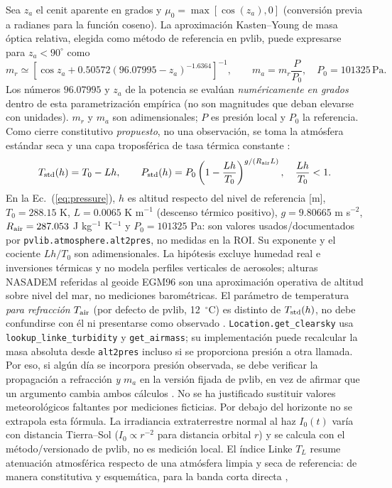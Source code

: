 \documentclass[11pt,a4paper]{article}
\begin{document}
Sea $z_a$ el cenit aparente en grados y $\mu_0=\max[\cos(z_a),0]$ (conversión previa a radianes para la función coseno). La aproximación Kasten--Young de masa óptica relativa, elegida como método de referencia en pvlib, puede expresarse para $z_a<90^\circ$ como \cite{kastenyoung1989,pvlibairmass}
\begin{equation}
 m_r\simeq\left[\cos z_a+0.50572(96.07995-z_a)^{-1.6364}\right]^{-1},\qquad
 m_a=m_r\frac{P}{P_0},\quad P_0=101325\,\mathrm{Pa}.\label{eq:airmass}
\end{equation}
Los números $96.07995$ y $z_a$ de la potencia se evalúan \emph{numéricamente en grados} dentro de esta parametrización empírica (no son magnitudes que deban elevarse con unidades). $m_r$ y $m_a$ son adimensionales; $P$ es presión local y $P_0$ la referencia. Como cierre constitutivo \emph{propuesto}, no una observación, se toma la atmósfera estándar seca y una capa troposférica de tasa térmica constante \cite{pvlibalt2pres}:
\begin{equation}
 T_{\rm std}(h)=T_0-Lh,\qquad
 P_{\rm std}(h)=P_0\left(1-\frac{Lh}{T_0}\right)^{g/(R_{\rm air}L)},\quad
 \frac{Lh}{T_0}<1.\label{eq:pressure}
\end{equation}
En la Ec.~(\ref{eq:pressure}), $h$ es altitud respecto del nivel de referencia [m], $T_0=288.15$ K, $L=0.0065$ K m$^{-1}$ (descenso térmico positivo), $g=9.80665$ m s$^{-2}$, $R_{\rm air}=287.053$ J kg$^{-1}$ K$^{-1}$ y $P_0=101325$ Pa: son valores usados/documentados por \texttt{pvlib.atmosphere.alt2pres}, no medidas en la ROI. Su exponente y el cociente $Lh/T_0$ son adimensionales. La hipótesis excluye humedad real e inversiones térmicas y no modela perfiles verticales de aerosoles; alturas NASADEM referidas al geoide EGM96 son una aproximación operativa de altitud sobre nivel del mar, no mediciones barométricas. El parámetro de temperatura \emph{para refracción} $T_{\rm air}$ (por defecto de pvlib, 12~$^\circ$C) es distinto de $T_{\rm std}(h)$, no debe confundirse con él ni presentarse como observado \cite{pvlibspa}. \texttt{Location.get\_clearsky} usa \texttt{lookup\_linke\_turbidity} y \texttt{get\_airmass}; su implementación puede recalcular la masa absoluta desde \texttt{alt2pres} incluso si se proporciona presión a otra llamada. Por eso, si algún día se incorpora presión observada, se debe verificar la propagación a refracción \emph{y} $m_a$ en la versión fijada de pvlib, en vez de afirmar que un argumento cambia ambos cálculos \cite{pvliblocationsource}. No se ha justificado sustituir valores meteorológicos faltantes por mediciones ficticias. Por debajo del horizonte no se extrapola esta fórmula. La irradiancia extraterrestre normal al haz $I_0(t)$ varía con distancia Tierra--Sol ($I_0\propto r^{-2}$ para distancia orbital $r$) y se calcula con el método/versionado de pvlib, no es medición local. El índice Linke $T_L$ resume atenuación atmosférica respecto de una atmósfera limpia y seca de referencia: de manera constitutiva y esquemática, para la banda corta directa \cite{ineichen2002},
\end{document}
